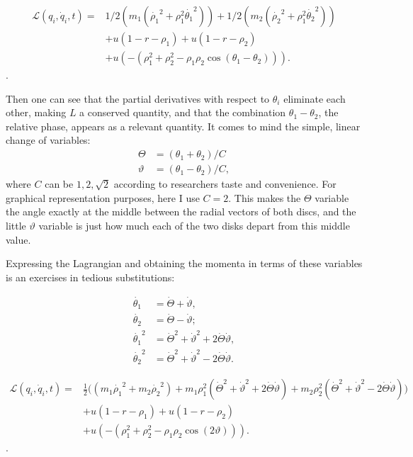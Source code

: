 \documentclass[letterpaperr,12pt]{article}
\newcommand{\Lagr}{\mathcal{L}\xspace}
\begin{document}
\begin{equation}
\begin{split}
\Lagr (q_i,\dot{q}_i,t) 
= & 1/2 (m_1 (\dot{\rho_1}^2+\rho_1^2 \dot{\theta_1}^2))
  +1/2 (m_2 (\dot{\rho_2}^2+\rho_1^2 \dot{\theta_2}^2)) \\
 & +u(1-r-\rho_1)+u(1-r-\rho_2) \\
 & +u(-(\rho_1^2+\rho_2^2-\rho_1\rho_2\cos(\theta_1-\theta_2))).
\end{split}
\end{equation}.

Then one can see that the partial derivatives with respect
to $\theta_i$ eliminate each other, making $L$ a conserved
quantity, and that the combination $\theta_1-\theta_2$,
the relative phase, appears as a relevant quantity. It
comes to mind the simple, linear change of variables:
\begin{align}
\Theta & = (\theta_1+\theta_2)/C \\
\vartheta  & = (\theta_1-\theta_2)/C,
\end{align}
where $C$ can be $1,2,\sqrt{2}$ according
to researchers taste and convenience. For graphical representation
purposes, here I use $C=2$. This makes the $\Theta$ variable
the angle exactly at the middle between the radial vectors
of both discs, and the little $\vartheta$ variable is just how
much each of the two disks depart from this middle value.

Expressing the Lagrangian and obtaining the momenta in terms of these
variables is an exercises in tedious substitutions:

\begin{align}
\dot{\theta_1} & = \dot{\Theta}+\dot{\vartheta}, \\
\dot{\theta_2} & = \dot{\Theta}-\dot{\vartheta}; \\
\dot{\theta_1}^2 & = \dot{\Theta}^2+\dot{\vartheta}^2+2\dot{\Theta}\dot{\vartheta}, \\
\dot{\theta_2}^2 & = \dot{\Theta}^2+\dot{\vartheta}^2-2\dot{\Theta}\dot{\vartheta}.
\end{align}



\begin{equation}
\begin{split}
\Lagr (q_i,\dot{q}_i,t) 
= & \frac{1}{2} \Big( (m_1\dot{\rho_1}^2+m_2\dot{\rho_2}^2)
  + m_1 \rho_1^2 (\dot{\Theta}^2+\dot{\vartheta}^2+2\dot{\Theta}\dot{\vartheta})
  + m_2 \rho_2^2 (\dot{\Theta}^2+\dot{\vartheta}^2-2\dot{\Theta}\dot{\vartheta})
\Big) \\
 & +u(1-r-\rho_1)+u(1-r-\rho_2) \\
 & +u(-(\rho_1^2+\rho_2^2-\rho_1\rho_2\cos(2\vartheta))).
\end{split}
\end{equation}.
\end{document}
